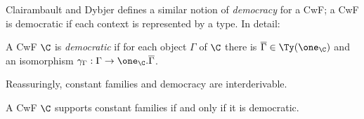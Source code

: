 \documentclass{article}
\begin{document}
Clairambault and Dybjer \cite{clairambaultDybjer2011lcccML} defines a
similar notion of \emph{democracy} for a CwF; a CwF is democratic if
each context is represented by a type. In detail:

\begin{definition}
  A CwF $\C$ is \emph{democratic} if for each object $\Gamma$ of $\C$
  there is $\overline{\Gamma} \in \Ty(\one_{\C})$ and an isomorphism
  $\gamma_{\Gamma} : \Gamma \to \one_{\C}.\overline{\Gamma}$.
\end{definition}

Reassuringly, constant families and democracy are interderivable.

\begin{proposition}
  A CwF $\C$ supports constant families if and only if it is democratic.
\end{proposition}
\end{document}
